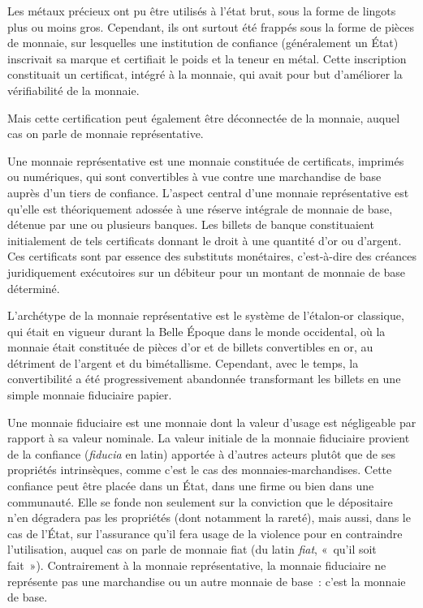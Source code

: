 Les métaux précieux ont pu être utilisés à l'état brut, sous la forme de lingots plus ou moins gros. Cependant, ils ont surtout été frappés sous la forme de pièces de monnaie, sur lesquelles une institution de confiance (généralement un État) inscrivait sa marque et certifiait le poids et la teneur en métal. Cette inscription constituait un certificat, intégré à la monnaie, qui avait pour but d'améliorer la vérifiabilité de la monnaie.


Mais cette certification peut également être déconnectée de la monnaie, auquel cas on parle de monnaie représentative.

Une monnaie représentative est une monnaie constituée de certificats, imprimés ou numériques, qui sont convertibles à vue contre une marchandise de base auprès d'un tiers de confiance. L'aspect central d'une monnaie représentative est qu'elle est théoriquement adossée à une réserve intégrale de monnaie de base, détenue par une ou plusieurs banques. Les billets de banque constituaient initialement de tels certificats donnant le droit à une quantité d'or ou d'argent. Ces certificats sont par essence des substituts monétaires, c'est-à-dire des créances juridiquement exécutoires sur un débiteur pour un montant de monnaie de base déterminé.

L'archétype de la monnaie représentative est le système de l'étalon-or classique, qui était en vigueur durant la Belle Époque dans le monde occidental, où la monnaie était constituée de pièces d'or et de billets convertibles en or, au détriment de l'argent et du bimétallisme. Cependant, avec le temps, la convertibilité a été progressivement abandonnée transformant les billets en une simple monnaie fiduciaire papier.


Une monnaie fiduciaire est une monnaie dont la valeur d'usage est négligeable par rapport à sa valeur nominale. La valeur initiale de la monnaie fiduciaire provient de la confiance (\emph{fiducia} en latin) apportée à d'autres acteurs plutôt que de ses propriétés intrinsèques, comme c'est le cas des monnaies-marchandises. Cette confiance peut être placée dans un État, dans une firme ou bien dans une communauté. Elle se fonde non seulement sur la conviction que le dépositaire n'en dégradera pas les propriétés (dont notamment la rareté), mais aussi, dans le cas de l'État, sur l'assurance qu'il fera usage de la violence pour en contraindre l'utilisation, auquel cas on parle de monnaie fiat (du latin \emph{fiat}, «~qu'il soit fait~»). Contrairement à la monnaie représentative, la monnaie fiduciaire ne représente pas une marchandise ou un autre monnaie de base~: c'est la monnaie de base.

